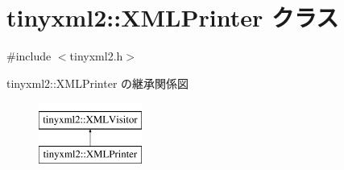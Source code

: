 \hypertarget{classtinyxml2_1_1_x_m_l_printer}{}\section{tinyxml2\+:\+:X\+M\+L\+Printer クラス}
\label{classtinyxml2_1_1_x_m_l_printer}


{\ttfamily \#include $<$tinyxml2.\+h$>$}

tinyxml2\+:\+:X\+M\+L\+Printer の継承関係図\begin{figure}[H]
\begin{center}
\leavevmode
\includegraphics[height=2.000000cm]{classtinyxml2_1_1_x_m_l_printer}
\end{center}
\end{figure}
